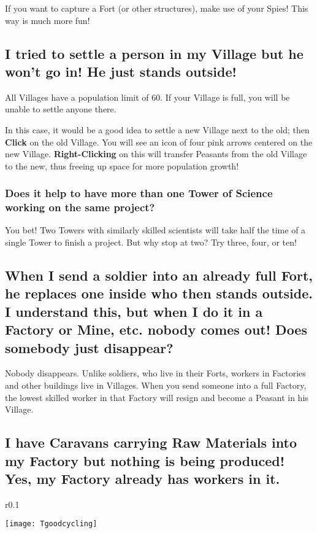 If you want to capture a Fort (or other structures), make use of your Spies! This way is much more fun!

\subsection{I tried to settle a person in my Village but he won’t go in! He just stands outside!}

All Villages have a population limit of 60. If your Village is full, you will be unable to settle anyone there.


In this case, it would be a good idea to settle a new Village next to the old; then \textbf{Click} on the old Village. You will see an icon of four pink arrows centered on the new Village. \textbf{Right-Clicking} on this will transfer Peasants from the old Village to the new, thus freeing up space for more population growth!

\subsubsection{Does it help to have more than one Tower of Science working on the same project?}

You bet! Two Towers with similarly skilled scientists will take half the time of a single Tower to finish a project. But why stop at two? Try three, four, or ten!

\subsection{When I send a soldier into an already full Fort, he replaces one inside who then stands outside. I understand this, but when I do it in a Factory or Mine, etc. nobody comes out! Does somebody just disappear?}

Nobody disappears. Unlike soldiers, who live in their Forts, workers in Factories and other buildings live in Villages. When you send someone into a full Factory, the lowest skilled worker in that Factory will resign and become a Peasant in his Village.

\subsection{I have Caravans carrying Raw Materials into my Factory but nothing is being produced! Yes, my Factory already has workers in it.}

\begin{wrapfigure}{r}{0.1\textwidth}
	\vspace{-20pt}
	\begin{center}
		\texttt{[image: Tgoodcycling]}
	\end{center}
	\vspace{-20pt}
\end{wrapfigure}

